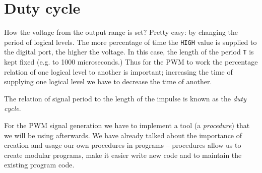\documentclass[../sparc.tex]{subfiles}
\begin{document}
\section{Duty cycle}

How the voltage from the output range is set?  Pretty easy: by changing the
period of logical levels.  The more percentage of time the \texttt{HIGH} value
is supplied to the digital port, the higher the voltage.  In this case, the
length of the period \texttt{T} is kept fixed (e.g. to 1000 microseconds.)  Thus
for the \gls{PWM} to work the percentage relation of one logical level to
another is important; increasing the time of supplying one logical level we have
to decrease the time of another.


The relation of signal period to the length of the impulse is known as the
\emph{duty cycle}.


For the PWM signal generation we have to implement a tool (a \emph{procedure})
that we will be using afterwards.  We have already talked about the importance
of creation and usage our own procedures in programs -- procedures allow us to
create modular programs, make it easier write new code and to maintain the
existing program code.
\end{document}
